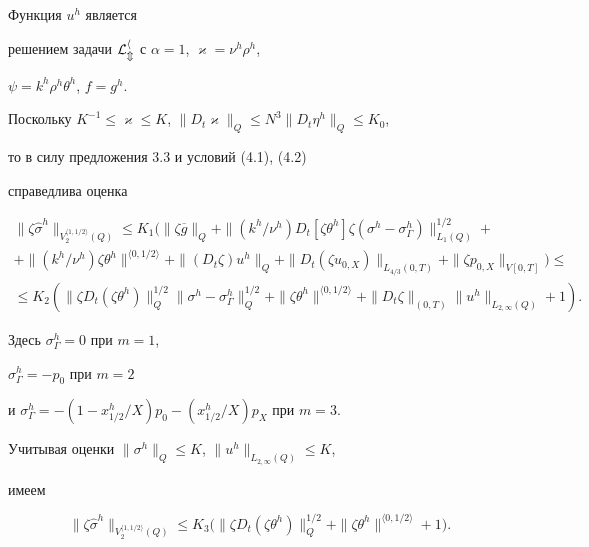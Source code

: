 \begin{pf} Функция $u^h$ является


решением задачи $\cal L_m^h$ с $\alpha=1$, $\varkappa=\nu^h\rho^h$,


$\psi=k^h\rho^h\theta^h$, $f=g^h$.


Поскольку $K^{-1}\le \varkappa\le K$, $\|D_t\varkappa\|_Q\le


N^3\|D_t\eta^h\|_Q\le K_0$,


то в силу предложения 3.3 и условий (4.1), (4.2)


справедлива оценка


\begin{multline*}


\|\zeta\widehat\sigma^h\|_{V_2^{\langle 1,1/2\rangle}(Q)}\le


K_1\big(\|\zeta\overline g\|_Q+


\|(k^h/\nu^h)D_t[\zeta\theta^h]\zeta(\sigma^h-


\sigma^h_{\Gamma})\|^{1/2}_{L_1(Q)}+\\


+\|(k^h/\nu^h)\zeta\theta^h\|^{\langle 0,1/2\rangle}


+\|(D_t\zeta)u^h\|_Q+\|D_t(\zeta u_{0,X})\|_{L_{4/3}(0,T)}


+\|\zeta p_{0,X}\|_{V[0,T]}\big)\le\\


\le K_2(\|\zeta D_t(\zeta\theta^h)\|^{1/2}_Q


\|\sigma^h-\sigma^h_{\Gamma}\|^{1/2}_Q


+\|\zeta\theta^h\|^{\langle 0,1/2\rangle}


+\|D_t\zeta\|_{(0,T)}\|u^h\|_{L_{2,\infty}(Q)}+1).


\end{multline*}


Здесь $\sigma^h_{\Gamma}=0$ при $m=1$,


$\sigma^h_{\Gamma}=-p_0$ при $m=2$


и $\sigma^h_{\Gamma}=-(1-x^h_{1/2}/X)p_0-(x^h_{1/2}/X)p_X$ при $m=3$.


Учитывая оценки $\|\sigma^h\|_Q\le K$, $\|u^h\|_{L_{2,\infty}(Q)}\le K$,


имеем


\begin{equation}


\|\zeta\widehat\sigma^h\|_{V_2^{\langle 1,1/2\rangle}(Q)}\le


 K_3\big(\|\zeta D_t(\zeta\theta^h)\|^{1/2}_Q+


\|\zeta\theta^h\|^{\langle 0,1/2\rangle}+1\big).



\end{equation}
\end{pf}
